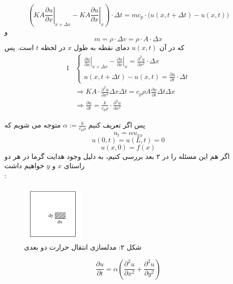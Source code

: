 \[(\left.KA\frac{\partial u}{\partial x}\right|_{x+\Delta x}-\left.KA\frac{\partial u}{\partial x}\right|_{x}) \cdot \Delta t=
mc_p \cdot \Big(u(x,t+\Delta t)-u(x,t)\Big)\]
و
\[m=\rho \cdot \Delta v=\rho \cdot  A \cdot \Delta x\]
که در آن $u(x,t)$ دمای نقطه به طول $x$ در لحظه $t$ است. پس
\begin{alignat*}{1}
	&\begin{cases}
		\left.\frac{\partial u}{\partial x}\right|_{x+\Delta x}-\left.\frac{\partial u}{\partial x}\right|_{x} = \frac{\partial^2 u}{\partial x^2}  \cdot \Delta x\\
		u(x,t+\Delta t)-u(x,t)=\frac{\partial u}{\partial t} \cdot \Delta t
	\end{cases} 
	\\& \Rightarrow 
	K A \cdot \frac{\partial^2 u}{\partial x^2}  \Delta x \Delta t=c_p\rho A\frac{\partial u}{\partial t}\Delta t\Delta x
	\\& \Rightarrow
	\frac{\partial u}{\partial t}=\frac{k}{c_p\rho} \cdot \frac{\partial^2 u}{\partial x^2}
\end{alignat*}

پس اگر تعریف کنیم
$\alpha := \frac{k}{c_p\rho}$
متوجه می شویم که\\
\[u_t=\alpha u_{xx}\]
\[u(0,t)=u(L,t)=0\]
\[u(x,0)=f(x)\]
اگر هم این مسئله را در ۲ بعد بررسی کنیم، به دلیل وجود هدایت گرما در هر دو راستای $x$ و $y$ خواهیم داشت\\:
\begin{figure}[H]
	\centering
	\includegraphics[width=0.275\textwidth]{im02.jpg}
	\caption*{شکل ۲: مدلسازی انتقال حرارت دو بعدی\\
		\large{
		}
	}
\end{figure}


\[\frac{\partial u}{\partial t}=\alpha(\frac{\partial^2 u}{\partial x^2}+\frac{\partial^2 u}{\partial y^2})\]
